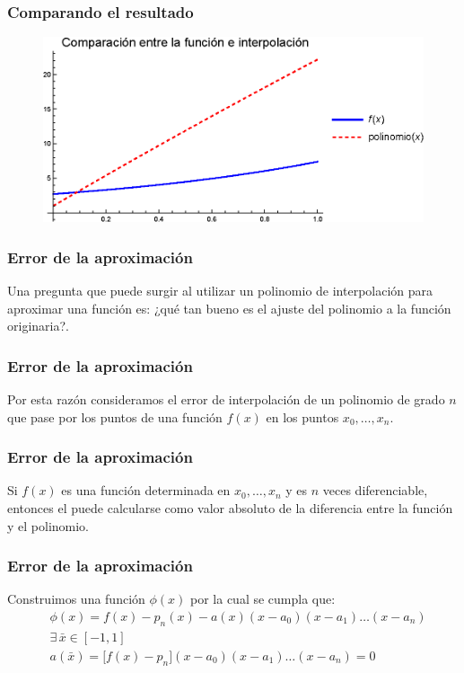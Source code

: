 \documentclass[12pt]{beamer}
\begin{document}
\begin{frame}
\frametitle{Comparando el resultado}
\begin{figure}
    \centering
    \includegraphics[scale=0.81]{Imagenes/Plot_Chebyshev_Ejercicio_Interp_02.eps}
\end{figure}
\end{frame}
\begin{frame}
\frametitle{Error de la aproximación}
Una pregunta que puede surgir al utilizar un polinomio de interpolación para aproximar una función es: \pause ¿qué tan bueno es el ajuste del polinomio a la función originaria?.
\end{frame}
\begin{frame}
\frametitle{Error de la aproximación}
Por esta razón consideramos el error de interpolación de un polinomio de grado $n$ que pase por los puntos de una función $f(x)$ en los puntos $x_{0}, \ldots, x_{n}$.
\end{frame}
\begin{frame}
\frametitle{Error de la aproximación}
Si $f(x)$ es una función determinada en $x_{0}, \ldots, x_{n}$ y es $n$ veces diferenciable, entonces el  puede calcularse como valor absoluto de la diferencia entre la función y el polinomio.
\end{frame}
\begin{frame}
\frametitle{Error de la aproximación}
Construimos una función $\phi (x)$ por la cual se cumpla que:
\pause
\begin{align*}
&\phi(x) = f(x) {-} p_{n}(x) {-} a(x)(x {-} a_{0})(x {-} a_{1}) \ldots (x {-} a_{n}) \\[0.5em]
&\exists \, \bar{x} \in [-1, 1] \\[0.5em]
&a(\bar{x}) = \big[ f(x) {-} p_{n} \big] (x {-} a_{0})(x {-} a_{1}) \ldots (x {-} a_{n}) = 0
\end{align*}
\end{frame}
\end{document}
